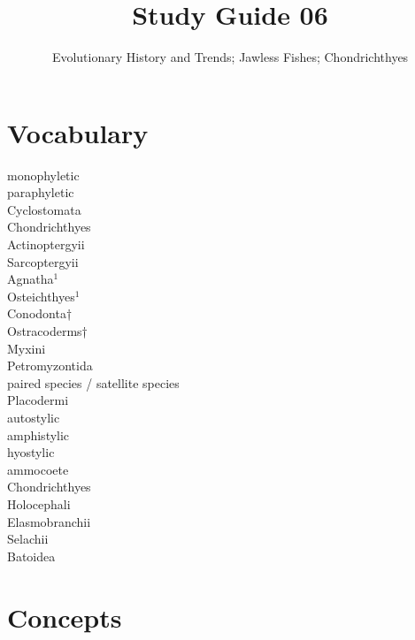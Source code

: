 \documentclass[nofonts, letterpaper]{tufte-handout}
\title{Study Guide 06}
\author{Evolutionary History and Trends; Jawless Fishes; Chondrichthyes}
\date{} %
\begin{document}
\maketitle	%


\section{Vocabulary}  
\vspace{-1\baselineskip}
\begin{multicols}{2}
monophyletic \\
paraphyletic \\
Cyclostomata \\
Chondrichthyes \\
Actinoptergyii \\
Sarcoptergyii \\
Agnatha$^1$ \\
Osteichthyes$^1$ \\
Conodonta† \\
Ostracoderms† \\
Myxini \\
Petromyzontida \\
paired species / satellite species \\
Placodermi \\
autostylic \\
amphistylic \\
hyostylic \\
ammocoete \\
Chondrichthyes \\
Holocephali \\
Elasmobranchii \\
Selachii \\
Batoidea 
\end{multicols}

\section{Concepts}
\end{document}
